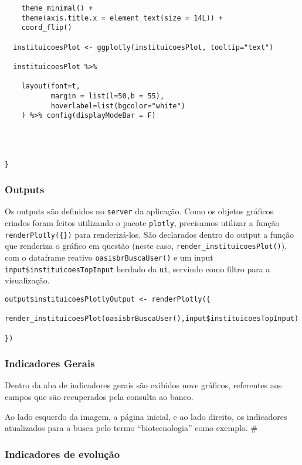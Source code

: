 \documentclass[
]{article}
\begin{document}
\begin{verbatim}
    theme_minimal() +
    theme(axis.title.x = element_text(size = 14L)) +
    coord_flip()
  
  instituicoesPlot <- ggplotly(instituicoesPlot, tooltip="text")
  
  instituicoesPlot %>%
    
    layout(font=t, 
           margin = list(l=50,b = 55),
           hoverlabel=list(bgcolor="white")
    ) %>% config(displayModeBar = F) 
  
  
  
  
}
\end{verbatim}

\hypertarget{outputs}{%
\subsubsection{Outputs}\label{outputs}}

Os outputs são definidos no \texttt{server} da aplicação. Como os
objetos gráficos criados foram feitos utilizando o pacote
\texttt{plotly}, precisamos utilizar a função
\texttt{renderPlotly(\{\})} para renderizá-los. São declarados dentro do
output a função que renderiza o gráfico em questão (neste caso,
\texttt{render\_instituicoesPlot()}), com o dataframe reativo
\texttt{oasisbrBuscaUser()} e um input
\texttt{input\$instituicoesTopInput} herdado da \texttt{ui}, servindo
como filtro para a visualização.

\begin{verbatim}
output$instituicoesPlotlyOutput <- renderPlotly({

render_instituicoesPlot(oasisbrBuscaUser(),input$instituicoesTopInput)

})
\end{verbatim}

\hypertarget{indicadores-gerais}{%
\subsubsection{Indicadores Gerais}\label{indicadores-gerais}}

Dentro da aba de indicadores gerais são exibidos nove gráficos,
referentes aos campos que são recuperados pela consulta ao banco.

Ao lado esquerdo da imagem, a página inicial, e ao lado direito, os
indicadores atualizados para a busca pelo termo ``biotecnologia'' como
exemplo. \#

\hypertarget{indicadores-de-evoluuxe7uxe3o-1}{%
\subsubsection{Indicadores de
evolução}\label{indicadores-de-evoluuxe7uxe3o-1}}
\end{document}
